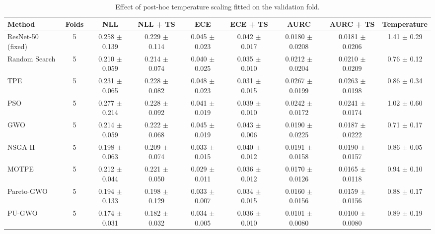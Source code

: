 \begin{table}[t]
\centering
\caption{Effect of post-hoc temperature scaling fitted on the validation fold.}
\label{tab:table3b_temperature_scaling}
\small
\begin{tabular}{lcccccccc}
\toprule
Method & Folds & NLL & NLL + TS & ECE & ECE + TS & AURC & AURC + TS & Temperature \\
\midrule
ResNet-50 (fixed) & 5 & 0.258 $\pm$ 0.139 & 0.229 $\pm$ 0.114 & 0.045 $\pm$ 0.023 & 0.042 $\pm$ 0.017 & 0.0180 $\pm$ 0.0208 & 0.0181 $\pm$ 0.0206 & 1.41 $\pm$ 0.29 \\
Random Search & 5 & 0.210 $\pm$ 0.059 & 0.214 $\pm$ 0.074 & 0.040 $\pm$ 0.025 & 0.035 $\pm$ 0.010 & 0.0212 $\pm$ 0.0204 & 0.0210 $\pm$ 0.0209 & 0.76 $\pm$ 0.12 \\
TPE & 5 & 0.231 $\pm$ 0.065 & 0.228 $\pm$ 0.082 & 0.048 $\pm$ 0.023 & 0.031 $\pm$ 0.015 & 0.0267 $\pm$ 0.0199 & 0.0263 $\pm$ 0.0198 & 0.86 $\pm$ 0.34 \\
PSO & 5 & 0.277 $\pm$ 0.214 & 0.228 $\pm$ 0.092 & 0.041 $\pm$ 0.019 & 0.039 $\pm$ 0.010 & 0.0242 $\pm$ 0.0172 & 0.0241 $\pm$ 0.0174 & 1.02 $\pm$ 0.60 \\
GWO & 5 & 0.214 $\pm$ 0.059 & 0.222 $\pm$ 0.068 & 0.045 $\pm$ 0.019 & 0.043 $\pm$ 0.006 & 0.0190 $\pm$ 0.0225 & 0.0187 $\pm$ 0.0222 & 0.71 $\pm$ 0.17 \\
NSGA-II & 5 & 0.198 $\pm$ 0.063 & 0.209 $\pm$ 0.074 & 0.033 $\pm$ 0.015 & 0.040 $\pm$ 0.012 & 0.0191 $\pm$ 0.0158 & 0.0190 $\pm$ 0.0157 & 0.86 $\pm$ 0.05 \\
MOTPE & 5 & 0.212 $\pm$ 0.044 & 0.221 $\pm$ 0.050 & 0.029 $\pm$ 0.011 & 0.036 $\pm$ 0.012 & 0.0170 $\pm$ 0.0126 & 0.0165 $\pm$ 0.0118 & 0.94 $\pm$ 0.10 \\
Pareto-GWO & 5 & 0.194 $\pm$ 0.133 & 0.198 $\pm$ 0.129 & 0.033 $\pm$ 0.007 & 0.034 $\pm$ 0.015 & 0.0160 $\pm$ 0.0156 & 0.0159 $\pm$ 0.0156 & 0.88 $\pm$ 0.17 \\
PU-GWO & 5 & 0.174 $\pm$ 0.031 & 0.182 $\pm$ 0.032 & 0.034 $\pm$ 0.005 & 0.036 $\pm$ 0.010 & 0.0101 $\pm$ 0.0080 & 0.0100 $\pm$ 0.0080 & 0.89 $\pm$ 0.19 \\
\bottomrule
\end{tabular}
\end{table}
